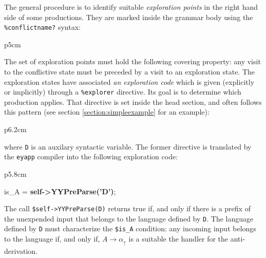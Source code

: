 \begin{enumerate}
The general procedure is 
to identify suitable {\it exploration points} in the right hand side of some productions.
They are  marked inside
the grammar body using the \verb|%conflictname?| syntax:
\begin{center}
\begin{tabular}{p{5cm}}
\end{tabular}
\end{center}
The set of exploration points must hold the following covering property:
any visit to the conflictive state must be preceded by a visit to 
an exploration state. The exploration states have associated {\it an exploration
code} which is given (explicitly or implicitly) through a \verb|%explorer| directive.
Its goal is to determine which production applies.
That directive is set inside the head section, and often follows this pattern (see section 
\ref{section:simpleexample}
for an example):
\begin{center}
\begin{tabular}{p{6.2cm}}
\begin{VERBATIM}[numbers=none, codes={\catcode`$=3\catcode`\_=8}]
\textbf{%
\ldots
\end{VERBATIM}
\end{tabular}
\end{center}
where \verb|D| is an auxilary syntactic variable.
The former directive is translated by the \verb|eyapp|
compiler into  the following exploration code:
\begin{center}
\begin{tabular}{p{5.8cm}}
\begin{VERBATIM}[numbers=none, codes={\catcode`$=3\catcode`\_=8}]
\Dr{}is\_A = \textbf{\Dr{}self->YYPreParse('D')}; 
\end{VERBATIM}
\end{tabular}
\end{center}
The call \verb|$self->YYPreParse(D)|
returns true if, and only if there is a prefix of the unexpended input
that belongs to the language defined by \verb|D|. 
The language defined by \verb|D|
must characterize the \verb|$is_A| condition: any incoming 
input belongs to the language if, and only if, 
$A \rightarrow \alpha_\uparrow$ is a suitable the handler
for the anti-derivation.


\end{enumerate}



